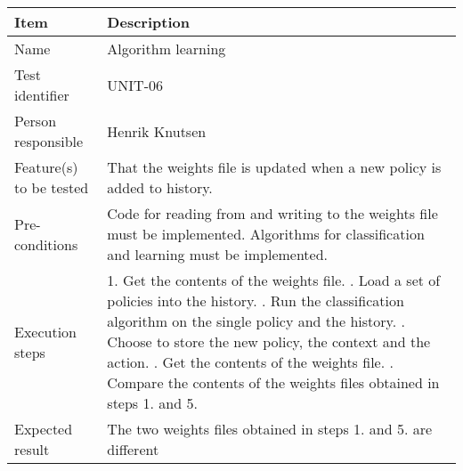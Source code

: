 \documentclass[12pt, fullpage, oneside]{report}
\begin{document}
		\begin{center}
			\begin{tabular}{ |  p{3.5cm} | p{10cm} | }
				\hline
				Item & Description \\ [5pt] \hline \hline
				Name & Algorithm learning \\  [5pt] \hline
				Test identifier & UNIT-06 \\  [5pt] \hline
				Person responsible & Henrik Knutsen \\  [5pt] \hline
				Feature(s) to be tested & That the weights file is updated when a new policy is added to history. \\  [5pt] \hline
				Pre-conditions & Code for reading from and writing to the weights file must be implemented. Algorithms for classification and learning must be implemented. \\  [5pt] \hline
				Execution steps & 1. Get the contents of the weights file. \newline 2. Load a set of policies into the history. \newline 3. Run the classification algorithm on the single policy and the history. \newline 4. Choose to store the new policy, the context and the action.
					\newline 5. Get the contents of the weights file. \newline 6. Compare the contents of the weights files obtained in steps 1. and 5. \\  [5pt] \hline
				Expected result & The two weights files obtained in steps 1. and 5. are different \\  [5pt] \hline
			\end{tabular}
		\end{center}
\end{document}
